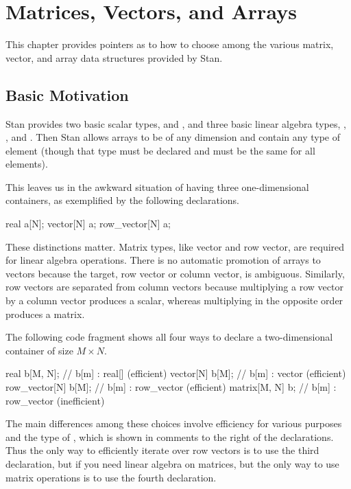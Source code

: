 \chapter{Matrices, Vectors, and Arrays}

\noindent
This chapter provides pointers as to how to choose among the various
matrix, vector, and array data structures provided by Stan.

\section{Basic Motivation}

Stan provides two basic scalar types,  and , and
three basic linear algebra types, , ,
and .  Then Stan allows arrays to be of any dimension and
contain any type of element (though that type must be declared and
must be the same for all elements).

This leaves us in the awkward situation of having three
one-dimensional containers, as exemplified by the following
declarations.
%
\begin{stancode}
real a[N];
vector[N] a;
row_vector[N] a;
\end{stancode}
%
These distinctions matter.  Matrix types, like vector and row vector,
are required for linear algebra operations.  There is no automatic
promotion of arrays to vectors because the target, row vector or
column vector, is ambiguous.  Similarly, row vectors are separated
from column vectors because multiplying a row vector by a column
vector produces a scalar, whereas multiplying in the opposite order
produces a matrix.

The following code fragment shows all four ways to declare a
two-dimensional container of size $M \times N$.
%
\begin{stancode}
real b[M, N];          // b[m] : real[]     (efficient)
vector[N] b[M];        // b[m] : vector     (efficient)
row_vector[N] b[M];    // b[m] : row_vector (efficient)
matrix[M, N] b;        // b[m] : row_vector (inefficient)
\end{stancode}
%
The main differences among these choices involve efficiency for
various purposes and the type of , which is shown in
comments to the right of the declarations.  Thus the only way to
efficiently iterate over row vectors is to use the third declaration,
but if you need linear algebra on matrices, but the only way to use
matrix operations is to use the fourth declaration.

